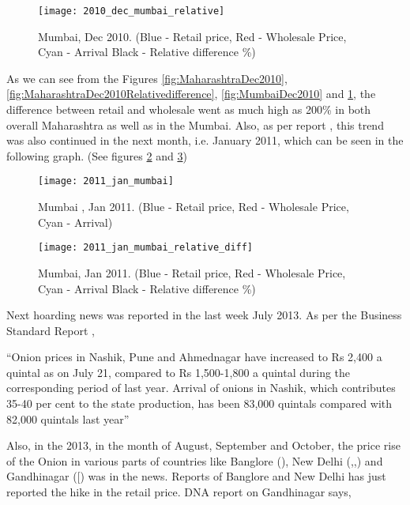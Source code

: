 \begin{figure}[here]
\begin{center}	
\texttt{[image: 2010\_dec\_mumbai\_relative]} 
\caption{Mumbai, Dec 2010. (Blue - Retail price, Red - Wholesale Price, Cyan - Arrival Black - Relative difference \%)}
\label{fig:MumbaiDec2010Relativedifference}
\end{center}
\end{figure}

As we can see from the Figures \ref{fig:MaharashtraDec2010}, \ref{fig:MaharashtraDec2010Relativedifference}, \ref{fig:MumbaiDec2010} and \ref{fig:MumbaiDec2010Relativedifference}, the difference between retail and wholesale went as much high as 200\% in both overall Maharashtra as well as in the Mumbai. Also, as per report \cite{Theg88:online}, this trend was also continued in the next month, i.e. January 2011, which can be seen in the following graph. (See figures \ref{fig:MumbaiJan2011} and \ref{fig:MumbaiJan2011Relativediff})

\begin{figure}[here]
\begin{center}	
\texttt{[image: 2011\_jan\_mumbai]} 
\caption{Mumbai , Jan 2011. (Blue - Retail price, Red - Wholesale Price, Cyan - Arrival)}
\label{fig:MumbaiJan2011}
\end{center}
\end{figure}

\begin{figure}[here]
\begin{center}	
\texttt{[image: 2011\_jan\_mumbai\_relative\_diff]} 
\caption{Mumbai, Jan 2011. (Blue - Retail price, Red - Wholesale Price, Cyan - Arrival Black - Relative difference \%)}
\label{fig:MumbaiJan2011Relativediff}
\end{center}
\end{figure}

Next hoarding news was reported in the last week July 2013. As per the Business Standard Report \cite{Flyin19:online},

“Onion prices in Nashik, Pune and Ahmednagar have increased to Rs 2,400 a quintal as on July 21, compared to Rs 1,500-1,800 a quintal during the corresponding period of last year. Arrival of onions in Nashik, which contributes 35-40 per cent to the state production, has been 83,000 quintals compared with 82,000 quintals last year”

Also, in the 2013, in the month of August, September and October, the price rise of the Onion in various parts of countries like Banglore (\cite{Onion55:online}), New Delhi (\cite{Hoard62:online},\cite{Onion85:online},\cite{Noon17:online}) and Gandhinagar ([\cite{Govt81:online}) was in the news. Reports of Banglore and New Delhi has just reported the hike in the retail price. DNA report on Gandhinagar says,

